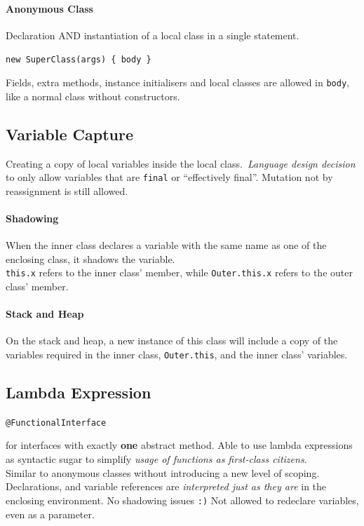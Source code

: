 \paragraph{Anonymous Class}
Declaration AND instantiation of a local class in a single statement.
\begin{center}
  \verb$new SuperClass(args) { body }$
\end{center}
Fields, extra methods, instance initialisers and local classes are allowed in
\verb$body$, like a normal class \textcolor{Bittersweet}{without constructors}.
\subsection{Variable Capture}
Creating a copy of local variables inside the local class.\ \emph{Language
design decision} to only allow variables that are \verb$final$
\textcolor{Bittersweet}{or ``effectively final''}. Mutation not by
reassignment is still allowed.
\paragraph{Shadowing}
When the inner class declares a variable with the same name as one of the
enclosing class, it shadows the variable.\\
\verb$this.x$ refers to the inner class' member, while \verb$Outer.this.x$
refers to the outer class' member.
\paragraph{Stack and Heap}
On the stack and heap, a new instance of this class will include a copy of the
variables required in the inner class, \verb$Outer.this$, and the inner class'
variables.
\subsection{Lambda Expression}
\begin{center}
  \verb$@FunctionalInterface$
\end{center}
for interfaces with exactly \textbf{one} abstract method. Able to use lambda
expressions as syntactic sugar to simplify \emph{usage of functions as
first-class citizens}.\\
Similar to anonymous classes without introducing a new level of scoping.
Declarations, and variable references are \emph{interpreted just as they are}
in the enclosing environment. No shadowing issues \verb$:)$
\textcolor{Bittersweet}{Not allowed to redeclare variables, even as a parameter.}
